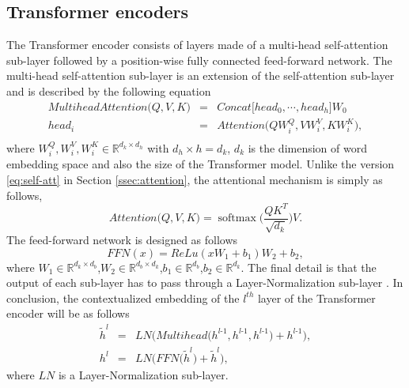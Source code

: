 \subsection{Transformer encoders}
\label{ssec:transformer-enc}
The Transformer encoder consists of layers made of a multi-head self-attention sub-layer followed by a position-wise fully connected feed-forward network. The multi-head self-attention sub-layer is an extension of the self-attention sub-layer and is described by the following equation
\begin{equation}
\begin{array}{rcl}
MultiheadAttention\big( Q,V,K \big) &=& Concat \big[ head_0, \cdots , head_h \big] W_0\\
head_i &=& Attention \big( QW_i^Q, VW_i^V, KW_i^K \big),\\
\end{array}
\end{equation}
where $W_i^Q, W_i^V, W_i^K \in \mathbb{R}^{d_k \times d_h}$ with $d_h \times h = d_k$, $d_k$ is the dimension of word embedding space and also the size of the Transformer model. Unlike the version \eqref{eq:self-att} in Section \ref{ssec:attention}, the attentional mechanism is simply as follows,
\begin{equation}
Attention\big( Q, V, K \big) = \operatorname{softmax}\big(\frac{Q K^T}{\sqrt{d_k}} \big) V.
\end{equation}
The feed-forward network is designed as follows
\begin{equation}
FFN(x) = ReLu(xW_1+b_1)W_2+b_2,
\end{equation}
where $W_1 \in \mathbb{R}^{d_k \times d_b}$,$W_2 \in \mathbb{R}^{d_b \times d_k}$,$b_1 \in \mathbb{R}^{d_b}$,$b_2 \in \mathbb{R}^{d_k}$.
The final detail is that the output of each sub-layer has to pass through a Layer-Normalization sub-layer \citep{Jimmy16layer}. In conclusion, the contextualized embedding of the $l^{th}$ layer of the Transformer encoder will be as follows
\begin{equation}
\begin{array}{rcl}
\tilde{h}^l &=& LN\bigg(Multihead\big(h^{l\text{-}1}, h^{l\text{-}1}, h^{l\text{-}1}\big) + h^{l\text{-}1}\bigg), \\ 
h^l &=& LN\bigg(FFN\big(\tilde{h}^l\big) + \tilde{h}^l\bigg),
\end{array}
\label{eq:self-att}
\end{equation}
where $LN$ is a Layer-Normalization sub-layer.
